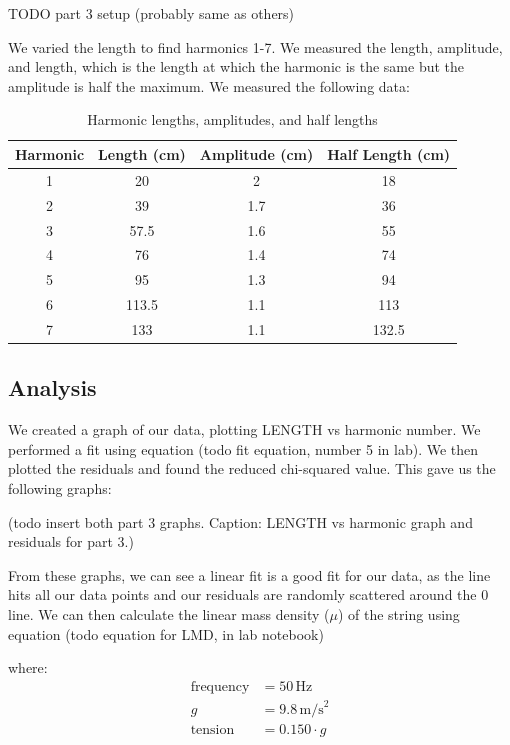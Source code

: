 \documentclass[11pt]{article}
\begin{document}
    TODO part 3 setup (probably same as others)

    We varied the length to find harmonics 1-7. We measured the length, amplitude, and length, which is the length at which the harmonic is the same but the amplitude is half the maximum. We measured the following data:

    \begin{table}[h]
    \centering
    \begin{tabular}{|c|c|c|c|}
    \hline
    \textbf{Harmonic} & \textbf{Length (cm)} & \textbf{Amplitude (cm)} & \textbf{Half Length (cm)} \\
    \hline
    1 & 20 & 2 & 18 \\
    2 & 39 & 1.7 & 36 \\
    3 & 57.5 & 1.6 & 55 \\
    4 & 76 & 1.4 & 74 \\
    5 & 95 & 1.3 & 94 \\
    6 & 113.5 & 1.1 & 113 \\
    7 & 133 & 1.1 & 132.5 \\
    \hline
    \end{tabular}
    \caption{Harmonic lengths, amplitudes, and half lengths}
    \label{tab:harmonic_lengths}
    \end{table}
    
    \subsection{Analysis}\label{subsec:part_3_analysis}
    We created a graph of our data, plotting LENGTH vs harmonic number. We performed a fit using equation (todo fit equation, number 5 in lab). We then plotted the residuals and found the reduced chi-squared value. This gave us the following graphs:

    (todo insert both part 3 graphs. Caption: LENGTH vs harmonic graph and residuals for part 3.)

    From these graphs, we can see a linear fit is a good fit for our data, as the line hits all our data points and our residuals are randomly scattered around the 0 line. We can then calculate the linear mass density ($\mu$) of the string using equation (todo equation for LMD, in lab notebook)
    
    where:
    \begin{align*}
    \text{frequency} &= 50 \, \text{Hz} \\
    g &= 9.8 \, \text{m/s}^2 \\
    \text{tension} &= 0.150 \cdot g\\
    \end{align*}
    
\end{document}
